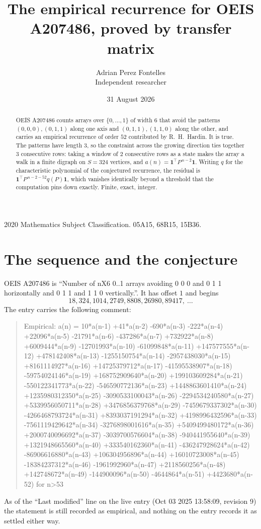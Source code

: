 \documentclass[11pt,a4paper]{article}
\title{The empirical recurrence for OEIS A207486, proved by transfer matrix}
\author{Adrian Perez Fontelles\\ \small Independent researcher}
\date{31 August 2026}
\theoremstyle{plain}
\theoremstyle{definition}
\begin{document}
\maketitle

\begin{abstract}
OEIS A207486 counts arrays over $\{0,\dots,1\}$ of width $6$ that avoid the patterns
$(0,0,0), (0,1,1)$ along one axis and $(0,1,1), (1,1,0)$ along the other, and carries an empirical recurrence of
order $52$ contributed by R.~H.~Hardin. It is true. The patterns have length $3$, so
the constraint across the growing direction ties together $3$ consecutive rows: taking a
window of $2$ consecutive rows as a state makes the array a walk in a finite digraph
on $S=324$ vertices, and $a(n)=\mathbf{1}^{\!\top}P^{\,n-2}\mathbf{1}$. Writing $q$
for the characteristic polynomial of the conjectured recurrence, the residual is
$\mathbf{1}^{\!\top}P^{\,n-2-52}q(P)\mathbf{1}$, which vanishes identically
beyond a threshold that the computation pins down exactly. Finite, exact, integer.
\end{abstract}

\noindent\small 2020 Mathematics Subject Classification. 05A15, 68R15, 15B36.\normalsize

\section{The sequence and the conjecture}

OEIS A207486 is ``Number of nX6 0..1 arrays avoiding 0 0 0 and 0 1 1 horizontally and 0 1 1 and 1 1 0 vertically.''. It has offset
$1$ and begins
\[
18, 324, 1014, 2749, 8808, 26980, 89417,\ \dots
\]
The entry carries the following comment:
\begin{quote}\small
Empirical: a(n) = 10*a(n-1) +41*a(n-2) -690*a(n-3) -222*a(n-4) +22096*a(n-5) -21791*a(n-6) -437286*a(n-7) +732922*a(n-8) +6009444*a(n-9) -12701993*a(n-10) -61099848*a(n-11) +147577555*a(n-12) +478142408*a(n-13) -1255150754*a(n-14) -2957438030*a(n-15) +8161114927*a(n-16) +14725379712*a(n-17) -41595538907*a(n-18) -59754024146*a(n-19) +168752909640*a(n-20) +199103609284*a(n-21) -550122341773*a(n-22) -546590772136*a(n-23) +1448863601410*a(n-24) +1235980312350*a(n-25) -3090533100043*a(n-26) -2294534240580*a(n-27) +5339956050711*a(n-28) +3476856379768*a(n-29) -7459679337302*a(n-30) -4266468793724*a(n-31) +8393037191294*a(n-32) +4198996432596*a(n-33) -7561119429642*a(n-34) -3276898001616*a(n-35) +5409499480172*a(n-36) +2000740096692*a(n-37) -3039700576604*a(n-38) -940441955640*a(n-39) +1321948665560*a(n-40) +333540162360*a(n-41) -436247928624*a(n-42) -86906616880*a(n-43) +106304956896*a(n-44) +16010723008*a(n-45) -18384237312*a(n-46) -1961992960*a(n-47) +2118560256*a(n-48) +142748672*a(n-49) -144900096*a(n-50) -4644864*a(n-51) +4423680*a(n-52) for n>53
\end{quote}
As of the ``Last modified'' line on the live entry (Oct 03 2025 13:58:09, revision
9) the statement is still recorded as empirical, and nothing on the entry
records it as settled either way.
\end{document}
